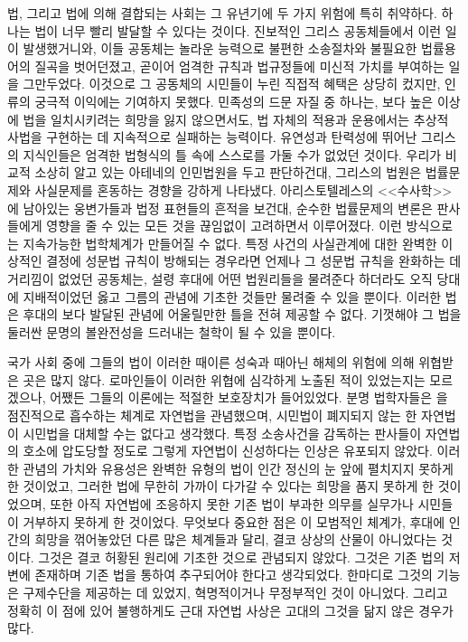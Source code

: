 법, 그리고 법에 의해 결합되는 사회는 그 유년기에
두 가지 위험에 특히 취약하다.
하나는 법이 너무 빨리 발달할 수 있다는 것이다.
진보적인 그리스 공동체들에서 이런 일이 발생했거니와,
이들 공동체는 놀라운 능력으로 불편한 소송절차와 불필요한 법률용어의
질곡을 벗어던졌고, 곧이어 엄격한 규칙과 법규정들에 미신적 가치를 부여하는 일을
그만두었다.
이것으로 그 공동체의 시민들이 누린 직접적 혜택은 상당히 컸지만,
인류의 궁극적 이익에는 기여하지 못했다.
민족성의 드문 자질 중 하나는,
보다 높은 이상에 법을 일치시키려는 희망을 잃지 않으면서도,
법 자체의 적용과 운용에서는
추상적 사법을 구현하는 데 지속적으로 실패하는 능력이다.
유연성과 탄력성에 뛰어난
그리스의 지식인들은
엄격한 법형식의 틀 속에 스스로를 가둘 수가 없었던 것이다.
우리가 비교적 소상히 알고 있는 아테네의 인민법원을 두고 판단하건대,
그리스의 법원은 법률문제와 사실문제를 혼동하는 경향을 강하게 나타냈다.
아리스토텔레스의 <<수사학>>에 남아있는
웅변가들과 법정 표현들의 흔적을 보건대,
순수한 법률문제의 변론은
판사들에게 영향을 줄 수 있는 모든 것을 끊임없이 고려하면서 이루어졌다.
이런 방식으로는 지속가능한 법학체계가 만들어질 수 없다.
특정 사건의 사실관계에 대한 완벽한 이상적인 결정에 성문법 규칙이 방해되는
경우라면 언제나 그 성문법 규칙을 완화하는 데 거리낌이 없었던 공동체는,
설령 후대에 어떤 법원리들을 물려준다 하더라도
오직 당대에 지배적이었던 옳고 그름의 관념에 기초한 것들만 물려줄 수 있을 뿐이다.
이러한 법은 후대의 보다 발달된 관념에 어울릴만한 틀을 전혀 제공할 수 없다.
기껏해야 그 법을 둘러싼 문명의 볼완전성을 드러내는 철학이 될 수 있을 뿐이다.

국가 사회 중에 그들의 법이
이러한 때이른 성숙과 때아닌 해체의 위험에 의해 위협받은 곳은 많지 않다.
로마인들이 이러한 위협에 심각하게 노출된 적이 있었는지는 모르겠으나,
어쨌든 그들의  이론에는 적절한 보호장치가 들어있었다.
분명 법학자들은 을 점진적으로 흡수하는 체계로 자연법을 관념했으며,
시민법이 폐지되지 않는 한 자연법이 시민법을 대체할 수는 없다고 생각했다.
특정 소송사건을 감독하는 판사들이 자연법의 호소에 압도당할 정도로
그렇게 자연법이 신성하다는 인상은 유포되지 않았다.
이러한 관념의 가치와 유용성은 완벽한 유형의 법이 인간 정신의 눈 앞에
펼치지지 못하게 한 것이었고, 그러한 법에 무한히 가까이 다가갈 수 있다는
희망을 품지 못하게 한 것이었으며, 또한 아직 자연법에 조응하지 못한
기존 법이 부과한 의무를 실무가나 시민들이 거부하지 못하게 한 것이었다.
무엇보다 중요한 점은 이 모범적인 체계가,
후대에 인간의 희망을 꺾어놓았던 다른 많은 체계들과 달리,
결코 상상의 산물이 아니었다는 것이다.
그것은 결코 허황된 원리에 기초한 것으로 관념되지 않았다.
그것은 기존 법의 저변에 존재하며 기존 법을 통하여 추구되어야 한다고 생각되었다.
한마디로 그것의 기능은 구제수단을 제공하는 데 있었지, 혁명적이거나
무정부적인 것이 아니었다.
그리고 정확히 이 점에 있어 불행하게도 근대 자연법 사상은 고대의 그것을
닮지 않은 경우가 많다.

